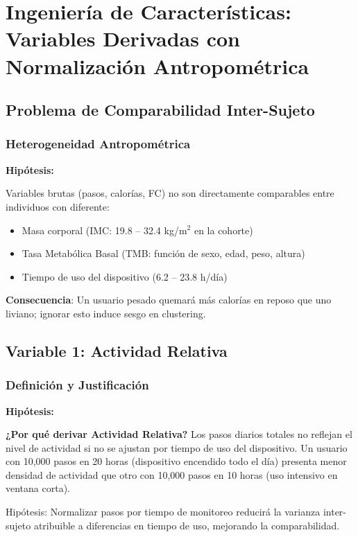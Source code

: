 \documentclass[12pt,letterpaper,twoside]{report}
\begin{document}
\chapter{Ingeniería de Características: Variables Derivadas con Normalización Antropométrica}

\section{Problema de Comparabilidad Inter-Sujeto}

\subsection{Heterogeneidad Antropométrica}

\begin{hipotesisbox}
\textbf{Hipótesis:}

Variables brutas (pasos, calorías, FC) no son directamente comparables entre individuos con diferente:
\begin{itemize}[noitemsep]
    \item Masa corporal (IMC: 19.8 -- 32.4 kg/m$^2$ en la cohorte)
    \item Tasa Metabólica Basal (TMB: función de sexo, edad, peso, altura)
    \item Tiempo de uso del dispositivo (6.2 -- 23.8 h/día)
\end{itemize}

\textbf{Consecuencia}: Un usuario pesado quemará más calorías en reposo que uno liviano; ignorar esto induce sesgo en clustering.
\end{hipotesisbox}

\section{Variable 1: Actividad Relativa}

\subsection{Definición y Justificación}

\begin{hipotesisbox}
\textbf{Hipótesis:}

\textbf{¿Por qué derivar Actividad Relativa?} Los pasos diarios totales no reflejan el nivel de actividad si no se ajustan por tiempo de uso del dispositivo. Un usuario con 10,000 pasos en 20 horas (dispositivo encendido todo el día) presenta menor densidad de actividad que otro con 10,000 pasos en 10 horas (uso intensivo en ventana corta).

Hipótesis: Normalizar pasos por tiempo de monitoreo reducirá la varianza inter-sujeto atribuible a diferencias en tiempo de uso, mejorando la comparabilidad.
\end{hipotesisbox}
\end{document}
